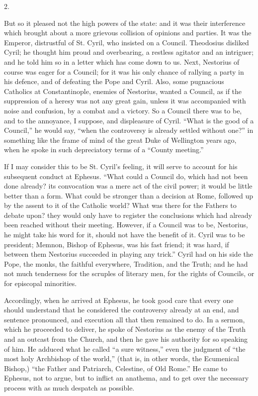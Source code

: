2.

But so it pleased not the high powers of the state: and it was
their interference which brought about a more grievous collision of
opinions and parties. It was the Emperor, distrustful of St. Cyril,
who insisted on a Council. Theodosius disliked Cyril; he thought him
proud and overbearing, a restless agitator and an intriguer; and he
told him so in a letter which has come down to us. Next, Nestorius of
course was eager for a Council; for it was his only chance of rallying
a party in his defence, and of defeating the Pope and Cyril. Also,
some pugnacious Catholics at Constantinople, enemies of
Nestorius, wanted a Council, as if the suppression of a heresy was not
any great gain, unless it was accompanied with noise and confusion, by
a combat and a victory. So a Council there was to be, and to the
annoyance, I suppose, and displeasure of Cyril. ``What is the good
of a Council,'' he would say, ``when the controversy is
already settled without one?'' in something like the frame of mind
of the great Duke of Wellington years ago, when he spoke in such
depreciatory terms of a ``County meeting.''

If I may consider this to be St. Cyril's feeling, it will serve to
account for his subsequent conduct at Ephesus. ``What could a
Council do, which had not been done already? its convocation was a
mere act of the civil power; it would be little better than a form.
What could be stronger than a decision at Rome, followed up by the
assent to it of the Catholic world? What was there for the Fathers to
debate upon? they would only have to register the conclusions which
had already been reached without their meeting. However, if a Council
was to be, Nestorius, he might take his word for it, should not have
the benefit of it. Cyril was to be president; Memnon, Bishop of
Ephesus, was his fast friend; it was hard, if between them Nestorius
succeeded in playing any trick.'' Cyril had on his side the Pope,
the monks, the faithful everywhere, Tradition, and the Truth; and he
had not much tenderness for the scruples of literary men, for the
rights of Councils, or for episcopal minorities.

Accordingly, when he arrived at Ephesus, he took good care that
every one should understand that he considered the controversy already
at an end, and sentence pronounced, and execution all that then
remained to do. In a sermon, which he proceeded to deliver, he spoke
of Nestorius as the enemy of the Truth and an outcast from the
Church, and then he gave his authority for so speaking of him. He
adduced what he called ``a sure witness,'' even the judgment
of ``the most holy Archbishop of the world,'' (that is, in
other words, the Ecumenical Bishop,) ``the Father and Patriarch,
Celestine, of Old Rome.'' He came to Ephesus, not to argue, but to
inflict an anathema, and to get over the necessary process with as
much despatch as possible.

